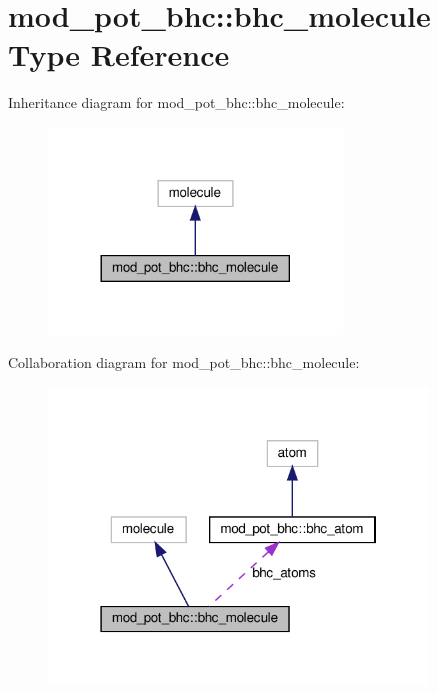 \hypertarget{structmod__pot__bhc_1_1bhc__molecule}{}\section{mod\+\_\+pot\+\_\+bhc\+:\+:bhc\+\_\+molecule Type Reference}
\label{structmod__pot__bhc_1_1bhc__molecule}


Inheritance diagram for mod\+\_\+pot\+\_\+bhc\+:\+:bhc\+\_\+molecule\+:
\nopagebreak
\begin{figure}[H]
\begin{center}
\leavevmode
\includegraphics[width=221pt]{structmod__pot__bhc_1_1bhc__molecule__inherit__graph}
\end{center}
\end{figure}


Collaboration diagram for mod\+\_\+pot\+\_\+bhc\+:\+:bhc\+\_\+molecule\+:
\nopagebreak
\begin{figure}[H]
\begin{center}
\leavevmode
\includegraphics[width=286pt]{structmod__pot__bhc_1_1bhc__molecule__coll__graph}
\end{center}
\end{figure}

